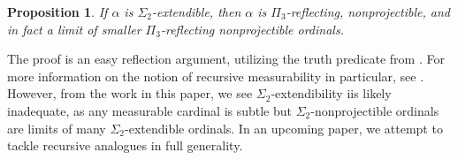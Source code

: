 \documentclass{article}
\theoremstyle{definition}
\theoremstyle{plain}
\theoremstyle{plain}
\theoremstyle{plain}
\newtheorem{proposition}[definition]{Proposition}
\theoremstyle{plain}
\theoremstyle{remark}
\theoremstyle{remark}
\theoremstyle{remark}
\theoremstyle{plain}
\theoremstyle{plain}
\theoremstyle{plain}
\begin{document}
\begin{proposition}
\label{ExtendibleRefAndNpr}
If $\alpha$ is $\Sigma_2$-extendible, then $\alpha$ is $\Pi_3$-reflecting, nonprojectible, and in fact a limit of smaller $\Pi_3$-reflecting nonprojectible ordinals.
\end{proposition}

The proof is an easy reflection argument, utilizing the truth predicate from \cite{levy}. For more information on the notion of recursive measurability in particular, see \cite{kaufmann}. However, from the work in this paper, we see $\Sigma_2$-extendibility iis likely inadequate, as any measurable cardinal is subtle but $\Sigma_2$-nonprojectible ordinals are limits of many $\Sigma_2$-extendible ordinals. In an upcoming paper, we attempt to tackle recursive analogues in full generality.

\printbibliography[heading=bibintoc,title={References}]
\end{document}
